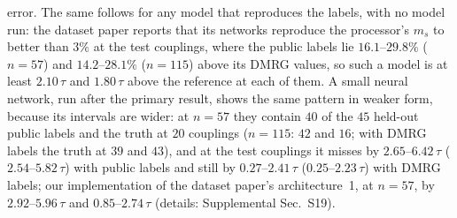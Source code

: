 \documentclass[aps,prx,twocolumn,10pt,superscriptaddress,nofootinbib,longbibliography,floatfix]{revtex4-2}
\theoremstyle{remark}
\newcommand{\ms}{m_s}
\begin{document}
error. The same follows for any model that reproduces the labels, with no model run: the dataset paper reports
that its networks reproduce the processor's $\ms$ to better than $3\%$ at the test couplings, where the public labels lie %
$16.1$--$29.8\%$ ($n=57$) and $14.2$--$28.1\%$ ($n=115$) above its DMRG values, so such a model is at least $2.10\,\tau$ %
and $1.80\,\tau$ above the reference at each of them. %
A small neural network, run after the primary result, shows the same pattern in
weaker form, because its intervals are wider: at $n=57$ they %
contain $40$ of the $45$ held-out public labels and the truth at $20$ couplings ($n=115$: $42$ and $16$; with %
DMRG labels the truth at $39$ and $43$), and at the test couplings it misses by $2.65$--$6.42\,\tau$ %
($2.54$--$5.82\,\tau$) with public labels and still by $0.27$--$2.41\,\tau$ ($0.25$--$2.23\,\tau$) with DMRG %
labels; our implementation of the dataset paper's architecture~1, at $n=57$, by $2.92$--$5.96\,\tau$ and %
$0.85$--$2.74\,\tau$ (details: Supplemental Sec.~S19). %
\end{document}
